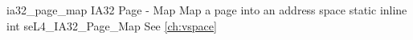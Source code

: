 %
%
%
%

\apidoc
{ia32_page_map}
{IA32 Page - Map}
{Map a page into an address space}
{static inline int seL4\_IA32\_Page\_Map}
{
}
{\errorenumdesc}
{See \autoref{ch:vspace}}
